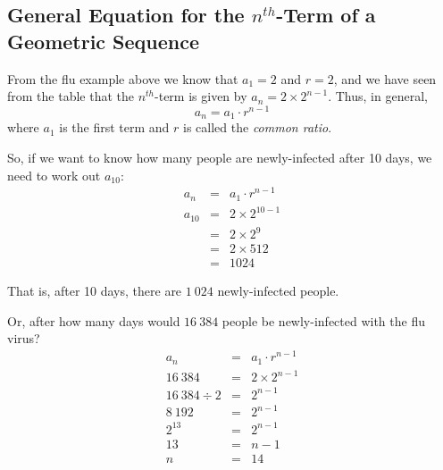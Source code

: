 
\subsection{General Equation for the $n^{th}$-Term of a Geometric Sequence}

From the flu example above we know that $a_1 = 2$ and $r = 2$, and we have seen from the table that the
$n^{th}$-term is given by $a_n = 2 \times 2^{n-1}$. Thus, in general,
\begin{equation}
a_n = a_1 \cdot r^{n-1}
\end{equation}
where $a_1$ is the first term and $r$ is called the \textit{common ratio}. 

So, if we want to know how many people are newly-infected after 10 days, we need to work
out $a_{10}$:
\begin{eqnarray*}
a_n &=& a_1 \cdot r^{n-1} \\
a_{10} &=& 2 \times 2^{10-1} \\
&=& 2 \times 2^9 \\
&=& 2 \times 512 \\
&=& 1024
\end{eqnarray*}

That is, after 10 days, there are $1~024$ newly-infected people.

Or, after how many days would $16~384$ people be newly-infected with the flu virus?
\begin{eqnarray*}
a_n &=& a_1 \cdot r^{n-1} \\
16~384 &=& 2 \times 2^{n-1} \\
16~384 \div 2 &=& 2^{n-1} \\
8~192 &=& 2^{n-1} \\
2^{13} &=& 2^{n-1} \\
13 &=& n - 1 \\
n &=& 14
\end{eqnarray*}

